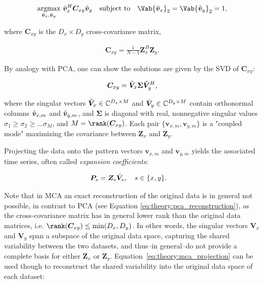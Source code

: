 \begin{align}\label{eq:theory:mca_maximization}
    \argmax_{\bmn{v}_{x}, \bmn{v}_{y}} \, \bmn{v}_{x}^H \bm{C}_{xy} \bmn{v}_{y} \quad \text{subject to} \quad \Vab{\bmn{v}_{x}}_2 = \Vab{\bmn{v}_{y}}_2 = 1,
\end{align}

where $\bm{C}_{xy}$ is the $D_x \times D_y$ cross-covariance matrix,

\begin{align}\label{eq:theory:mca_cross_covariance}
    \bm{C}_{xy} = \frac{1}{N-1} \bm{Z}_x^H \bm{Z}_y.
\end{align}

By analogy with PCA, one can show the solutions are given by the SVD of $\bm{C}_{xy}$:

\begin{align}\label{eq:theory:mca_svd}
    \bm{C}_{xy} = \tilde{\bm{V}}_x \bm{\Sigma} \tilde{\bm{V}}_y^H,
\end{align}

where the singular vectors $\tilde{\bm{V}}_x\in\mathbb{C}^{D_x \times M}$ and $\tilde{\bm{V}}_y\in\mathbb{C}^{D_y \times M}$ contain orthonormal columns $\tilde{\bm{v}}_{x,m}$ and $\tilde{\bm{v}}_{y,m}$, and $\bm{\Sigma}$ is diagonal with real, nonnegative singular values $\sigma_1 \geq \sigma_2 \geq \dots \sigma_M$, and $M=\rank(\bm{C}_{xy})$. Each pair $\{ \bm{v}_{x,m}, \bm{v}_{y,m}\}$ is a "coupled mode" maximizing the covariance between $\bm{Z}_x$ and $\bm{Z}_y$.

Projecting the data onto the pattern vectors $\bm{v}_{x,m}$ and $\bm{v}_{y,m}$ yields the associated time series, often called \textit{expansion coefficients}:

\begin{align}\label{eq:theory:mca_projection}
    \bm{P}_s &= \bm{Z}_s \tilde{\bm{V}}_s, \quad s\in\{x, y\}.
\end{align}

Note that in MCA an exact reconstruction of the original data is in general not possible, in contrast to PCA (see Equation \eqref{eq:theory:pca_reconstruction}), as the cross-covariance matrix has in general lower rank than the original data matrices, i.e. $\rank(\bm{C}_{xy}) \leq \min(D_x, D_y)$. In other words, the singular vectors $\bm{V}_x$ and $\bm{V}_y$ span a subspace of the original data space, capturing the shared variability between the two datasets, and thus--in general--do not provide a complete basis for either $\bm{Z}_x$ or $\bm{Z}_y$. Equation~\eqref{eq:theory:mca_projection} can be used though to reconstruct the shared variability into the original data space of each dataset:

